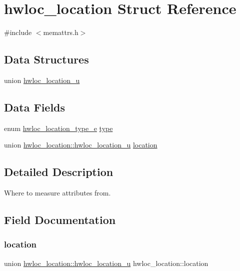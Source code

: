 \hypertarget{a00314}{}\section{hwloc\+\_\+location Struct Reference}
\label{a00314}


{\ttfamily \#include $<$memattrs.\+h$>$}

\subsection*{Data Structures}
\begin{DoxyCompactItemize}
\item 
union \hyperlink{a00318}{hwloc\+\_\+location\+\_\+u}
\end{DoxyCompactItemize}
\subsection*{Data Fields}
\begin{DoxyCompactItemize}
\item 
enum \hyperlink{a00211_ga33099ba58f607fc70925da3777688586}{hwloc\+\_\+location\+\_\+type\+\_\+e} \hyperlink{a00314_aeb9c0ab74a7d3506a76d0b82600a28a7}{type}
\item 
union \hyperlink{a00318}{hwloc\+\_\+location\+::hwloc\+\_\+location\+\_\+u} \hyperlink{a00314_a20cc864865c1133a833dabecff7626db}{location}
\end{DoxyCompactItemize}


\subsection{Detailed Description}
Where to measure attributes from. 

\subsection{Field Documentation}
\mbox{\label{a00314_a20cc864865c1133a833dabecff7626db}} 
\subsubsection{\texorpdfstring{location}{location}}
{\footnotesize\ttfamily union \hyperlink{a00318}{hwloc\+\_\+location\+::hwloc\+\_\+location\+\_\+u}  hwloc\+\_\+location\+::location}

